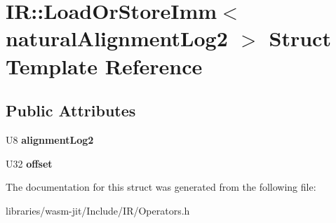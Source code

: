 \hypertarget{struct_i_r_1_1_load_or_store_imm}{}\section{IR\+:\+:Load\+Or\+Store\+Imm$<$ natural\+Alignment\+Log2 $>$ Struct Template Reference}
\label{struct_i_r_1_1_load_or_store_imm}
\subsection*{Public Attributes}
\begin{DoxyCompactItemize}
\item 
\mbox{\label{struct_i_r_1_1_load_or_store_imm_a30107d37953b93bfe82f75d1974c42cb}} 
U8 {\bfseries alignment\+Log2}
\item 
\mbox{\label{struct_i_r_1_1_load_or_store_imm_a7d5caef7b1309efc59a40aff46ef4ca1}} 
U32 {\bfseries offset}
\end{DoxyCompactItemize}


The documentation for this struct was generated from the following file\+:\begin{DoxyCompactItemize}
\item 
libraries/wasm-\/jit/\+Include/\+I\+R/Operators.\+h\end{DoxyCompactItemize}
